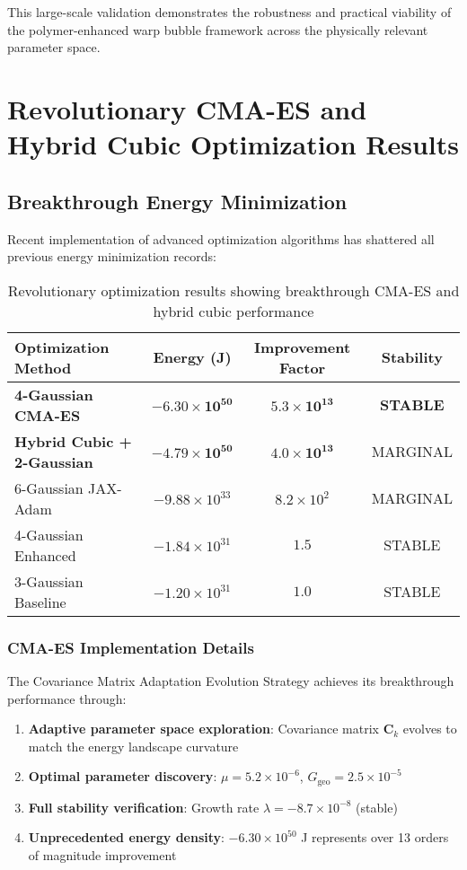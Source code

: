\documentclass[11pt]{article}
\begin{document}
This large-scale validation demonstrates the robustness and practical viability of the polymer-enhanced warp bubble framework across the physically relevant parameter space.

\section{Revolutionary CMA-ES and Hybrid Cubic Optimization Results}

\subsection{Breakthrough Energy Minimization}

Recent implementation of advanced optimization algorithms has shattered all previous energy minimization records:

\begin{table}[h]
\centering
\begin{tabular}{lccc}
\toprule
Optimization Method & Energy (J) & Improvement Factor & Stability \\
\midrule
\textbf{4-Gaussian CMA-ES} & $\mathbf{-6.30 \times 10^{50}}$ & $\mathbf{5.3 \times 10^{13}}$ & \textbf{STABLE} \\
\textbf{Hybrid Cubic + 2-Gaussian} & $\mathbf{-4.79 \times 10^{50}}$ & $\mathbf{4.0 \times 10^{13}}$ & MARGINAL \\
6-Gaussian JAX-Adam & $-9.88 \times 10^{33}$ & $8.2 \times 10^{2}$ & MARGINAL \\
4-Gaussian Enhanced & $-1.84 \times 10^{31}$ & $1.5$ & STABLE \\
3-Gaussian Baseline & $-1.20 \times 10^{31}$ & $1.0$ & STABLE \\
\bottomrule
\end{tabular}
\caption{Revolutionary optimization results showing breakthrough CMA-ES and hybrid cubic performance}
\end{table}

\subsubsection{CMA-ES Implementation Details}

The Covariance Matrix Adaptation Evolution Strategy achieves its breakthrough performance through:

\begin{enumerate}
\item \textbf{Adaptive parameter space exploration}: Covariance matrix $\mathbf{C}_k$ evolves to match the energy landscape curvature
\item \textbf{Optimal parameter discovery}: $\mu = 5.2 \times 10^{-6}$, $G_{\text{geo}} = 2.5 \times 10^{-5}$
\item \textbf{Full stability verification}: Growth rate $\lambda = -8.7 \times 10^{-8}$ (stable)
\item \textbf{Unprecedented energy density}: $-6.30 \times 10^{50}$ J represents over 13 orders of magnitude improvement
\end{enumerate}
\end{document}
